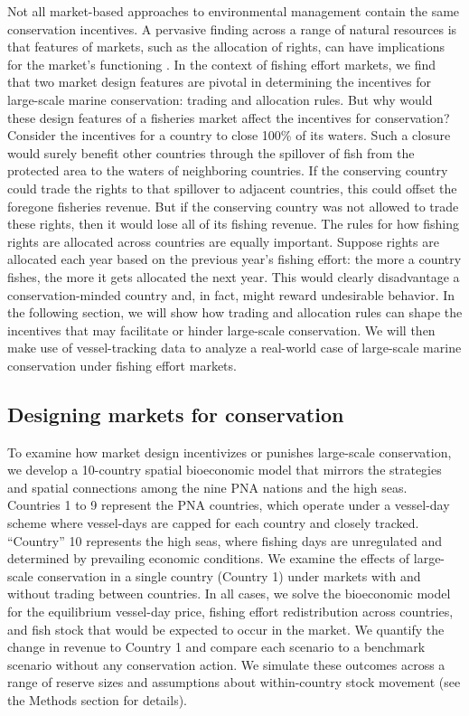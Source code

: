 \documentclass[12pt]{article}
\begin{document}
Not all market-based approaches to environmental management contain the same conservation incentives. A pervasive finding across a range of natural resources is that features of markets, such as the allocation of rights, can have implications for the market's functioning \cite{libecap_1989}. In the context of fishing effort markets, we find that two market design features are pivotal in determining the incentives for large-scale marine conservation: trading and allocation rules. But why would these design features of a fisheries market affect the incentives for conservation? Consider the incentives for a country to close 100\% of its waters. Such a closure would surely benefit other countries through the spillover of fish from the protected area to the waters of neighboring countries. If the conserving country could trade the rights to that spillover to adjacent countries, this could offset the foregone fisheries revenue. But if the conserving country was not allowed to trade these rights, then it would lose all of its fishing revenue. The rules for how fishing rights are allocated across countries are equally important. Suppose rights are allocated each year based on the previous year's fishing effort: the more a country fishes, the more it gets allocated the next year. This would clearly disadvantage a conservation-minded country and, in fact, might reward undesirable behavior. In the following section, we will show how trading and allocation rules can shape the incentives that may facilitate or hinder large-scale conservation. We will then make use of vessel-tracking data to analyze a real-world case of large-scale marine conservation under fishing effort markets.

\subsection{Designing markets for conservation}

To examine how market design incentivizes or punishes large-scale conservation, we develop a 10-country spatial bioeconomic model that mirrors the strategies and spatial connections among the nine PNA nations and the high seas. Countries 1 to 9 represent the PNA countries, which operate under a vessel-day scheme where vessel-days are capped for each country and closely tracked. ``Country'' 10 represents the high seas, where fishing days are unregulated and determined by prevailing economic conditions. We examine the effects of large-scale conservation in a single country (Country 1) under markets with and without trading between countries. In all cases, we solve the bioeconomic model for the equilibrium vessel-day price, fishing effort redistribution across countries, and fish stock that would be expected to occur in the market. We quantify the change in revenue to Country 1 and compare each scenario to a benchmark scenario without any conservation action. We simulate these outcomes across a range of reserve sizes and assumptions about within-country stock movement (see the Methods section for details).
\end{document}
